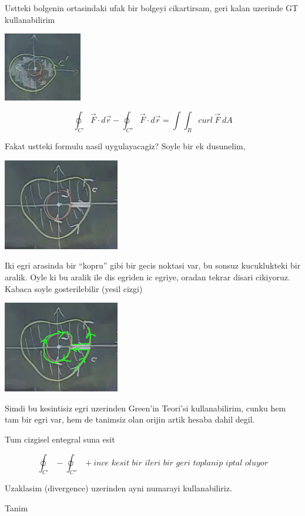 \documentclass[12pt,fleqn]{article}
\begin{document}
Ustteki bolgenin ortasindaki ufak bir bolgeyi cikartirsam, geri kalan
uzerinde GT kullanabilirim

\includegraphics[height=3cm]{24_4.png}


\[ \oint_{C'} \vec{F} \cdot d\vec{r} - 
\oint_{C''} \vec{F} \cdot d\vec{r}  =
\int \int_R curl \ \vec{F} \ dA 
\]
 
Fakat ustteki formulu nasil uygulayacagiz? Soyle bir ek dusunelim, 

\includegraphics[height=4cm]{24_5.png}

Iki egri arasinda bir ``kopru'' gibi bir gecis noktasi var, bu sonsuz
kucuklukteki bir aralik. Oyle ki bu aralik ile dis egriden ic egriye,
oradan tekrar disari cikiyoruz. Kabaca soyle gosterilebilir (yesil cizgi)

\includegraphics[height=4cm]{24_6.png}

Simdi bu kesintisiz egri uzerinden Green'in Teori'si kullanabilirim, cunku
hem tam bir egri var, hem de tanimsiz olan orijin artik hesaba dahil
degil. 

Tum cizgisel entegral suna esit 

\[ \oint_{C'} - \oint_{C''} + \textit{ince kesit bir ileri bir geri
  toplanip iptal oluyor} \] 

Uzaklasim (divergence) uzerinden ayni numarayi kullanabiliriz. 

Tanim 
\end{document}
